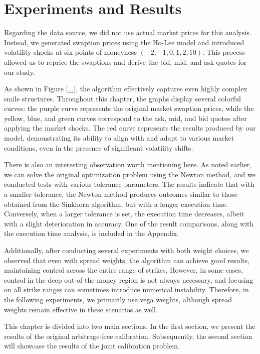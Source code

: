 \chapter{Experiments and Results}
Regarding the data source, we did not use actual market prices for this analysis. Instead, we generated swaption prices using the Ho-Lee model and introduced volatility shocks at six points of moneyness \((-2, -1, 0, 1, 2, 10)\). This process allowed us to reprice the swaptions and derive the bid, mid, and ask quotes for our study.

As shown in Figure \ref{...}, the algorithm effectively captures even highly complex smile structures. Throughout this chapter, the graphs display several colorful curves: the purple curve represents the original market swaption prices, while the yellow, blue, and green curves correspond to the ask, mid, and bid quotes after applying the market shocks. The red curve represents the results produced by our model, demonstrating its ability to align with and adapt to various market conditions, even in the presence of significant volatility shifts.

There is also an interesting observation worth mentioning here. As noted earlier, we can solve the original optimization problem using the Newton method, and we conducted tests with various tolerance parameters. The results indicate that with a smaller tolerance, the Newton method produces outcomes similar to those obtained from the Sinkhorn algorithm, but with a longer execution time. Conversely, when a larger tolerance is set, the execution time decreases, albeit with a slight deterioration in accuracy. One of the result comparisons, along with the execution time analysis, is included in the Appendix.

Additionally, after conducting several experiments with both weight choices, we observed that even with spread weights, the algorithm can achieve good results, maintaining control across the entire range of strikes. However, in some cases, control in the deep out-of-the-money region is not always necessary, and focusing on all strike ranges can sometimes introduce numerical instability. Therefore, in the following experiments, we primarily use vega weights, although spread weights remain effective in these scenarios as well.


This chapter is divided into two main sections. In the first section, 
we present the results of the original arbitrage-free calibration. 
Subsequently, the second section will showcase the results of the joint calibration problem.

